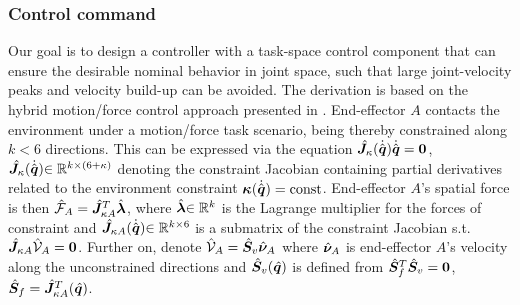 \subsubsection{Control command}
Our goal is to design a controller with a task-space control component that can ensure the desirable
nominal behavior in joint space,
such that large joint-velocity peaks and velocity build-up can be avoided.
The derivation is based on the hybrid motion/force control approach presented in \cite{Siciliano2008}.
End-effector $A$ contacts the environment under a motion/force task scenario,
being thereby constrained along $k < 6$ directions.
This can be expressed via the equation ${\hat{\bm{J}}}_{\kappa}(\dot{\hat{\bm{q}}})\dot{\hat{\bm{q}}} = \bm{0}$,
${\hat{\bm{J}}}_{\kappa}(\dot{\hat{\bm{q}}}){\in\mathbb{R}^{k \times (6+\kappa)}}$ denoting the constraint Jacobian containing
partial derivatives related to the environment constraint $\bm{\kappa}(\dot{\hat{\bm{q}}}) = \mathrm{const}$.
End-effector $A$'s spatial force is then $\hat{\mathcal{F}}_{A} = {\hat{\bm{J}}}_{\kappa A}^{T}{\hat{\bm{\lambda}}}$,
where ${\hat{\bm{\lambda}}}{\in\mathbb{R}^{k}}$ is the Lagrange multiplier for the forces of constraint and
${\hat{\bm{J}}}_{\kappa A}(\dot{\hat{\bm{q}}}){\in\mathbb{R}^{k \times 6}}$ is a submatrix of
the constraint Jacobian s.t.\ ${\hat{\bm{J}}}_{\kappa A}\hat{\mathcal{V}}_{A} = \bm{0}$.
Further on, denote $\hat{\mathcal{V}}_{A} = {\hat{\bm{S}}}_{v}{\hat{\bm{\nu}}}_{A}$ where ${\hat{\bm{\nu}}}_{A}$ is end-effector $A$'s
velocity along the unconstrained directions and ${\hat{\bm{S}}}_{v}(\hat{\bm{q}})$ is defined from ${\hat{\bm{S}}}_{f}^{T}{\hat{\bm{S}}}_{v} = \bm{0}$,
${\hat{\bm{S}}}_{f} = {\hat{\bm{J}}}_{\kappa A}^{T}(\hat{\bm{q}})$.

